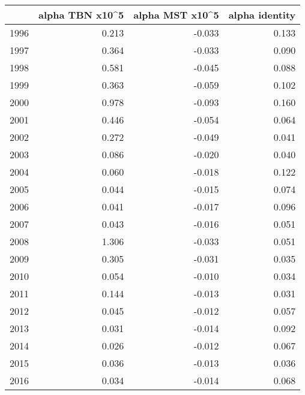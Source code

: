 \begin{tabular}{lrrr}
\toprule
{} &  alpha TBN x10\textasciicircum 5 &  alpha MST x10\textasciicircum 5 &  alpha identity \\
\midrule
1996 &            0.213 &           -0.033 &           0.133 \\
1997 &            0.364 &           -0.033 &           0.090 \\
1998 &            0.581 &           -0.045 &           0.088 \\
1999 &            0.363 &           -0.059 &           0.102 \\
2000 &            0.978 &           -0.093 &           0.160 \\
2001 &            0.446 &           -0.054 &           0.064 \\
2002 &            0.272 &           -0.049 &           0.041 \\
2003 &            0.086 &           -0.020 &           0.040 \\
2004 &            0.060 &           -0.018 &           0.122 \\
2005 &            0.044 &           -0.015 &           0.074 \\
2006 &            0.041 &           -0.017 &           0.096 \\
2007 &            0.043 &           -0.016 &           0.051 \\
2008 &            1.306 &           -0.033 &           0.051 \\
2009 &            0.305 &           -0.031 &           0.035 \\
2010 &            0.054 &           -0.010 &           0.034 \\
2011 &            0.144 &           -0.013 &           0.031 \\
2012 &            0.045 &           -0.012 &           0.057 \\
2013 &            0.031 &           -0.014 &           0.092 \\
2014 &            0.026 &           -0.012 &           0.067 \\
2015 &            0.036 &           -0.013 &           0.036 \\
2016 &            0.034 &           -0.014 &           0.068 \\
\bottomrule
\end{tabular}

